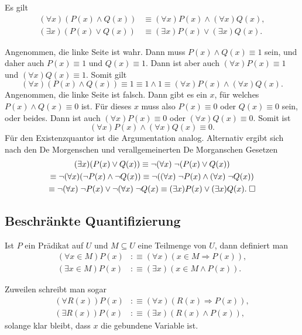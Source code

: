 \begin{Satz}[Verträglichkeitsgesetze]
Es gilt
\begin{align*}
(\forall x)(P(x)\land Q(x)) &\equiv (\forall x)P(x)\land (\forall x)Q(x),\\
(\exists x)(P(x)\lor Q(x)) &\equiv (\exists x)P(x)\lor (\exists x)Q(x).
\end{align*}
\end{Satz}
 Angenommen, die linke Seite ist wahr. Dann muss
$P(x)\land Q(x)\equiv 1$ sein, und daher auch $P(x)\equiv 1$ und
$Q(x)\equiv 1$. Dann ist aber auch
$(\forall x)P(x)\equiv 1$ und $(\forall x)Q(x)\equiv 1$. Somit gilt
\begin{equation}
(\forall x)(P(x)\land Q(x)) \equiv 1 \equiv
1\land 1 \equiv (\forall x)P(x)\land (\forall x)Q(x).
\end{equation}
Angenommen, die linke Seite ist falsch. Dann gibt es
ein $x$, für welches $P(x)\land Q(x)\equiv 0$ ist. Für dieses $x$
muss also $P(x)\equiv 0$ oder $Q(x)\equiv 0$ sein, oder beides.
Dann ist auch $(\forall x)P(x)\equiv 0$ oder $(\forall x)Q(x)\equiv 0$.
Somit ist
\begin{equation}
(\forall x)P(x)\land(\forall x)Q(x)\equiv 0.
\end{equation}
Für den Existenzquantor ist die Argumentation analog. Alternativ
ergibt sich nach den De Morgenschen und verallgemeinerten De Morganschen
Gesetzen
\begin{gather}
(\exists x)(P(x)\lor Q(x))
\equiv \neg(\forall x)\;\neg (P(x)\lor Q(x))\\
\equiv \neg(\forall x)(\neg P(x)\land \neg Q(x))
\equiv \neg((\forall x)\;\neg P(x)\land (\forall x)\;\neg Q(x))\\
\equiv \neg(\forall x)\;\neg P(x)\lor\neg(\forall x)\;\neg Q(x)
\equiv (\exists x) P(x)\lor(\exists x) Q(x).\;\Box
\end{gather}


\newpage
\subsection{Beschränkte Quantifizierung}
\begin{Definition}
Ist $P$ ein Prädikat auf $U$ und $M\subseteq U$ eine Teilmenge von
$U$, dann definiert man
\begin{align*}
(\forall x\in M)P(x) &:\equiv (\forall x)(x\in M\Rightarrow P(x)),\\
(\exists x\in M)P(x) &:\equiv (\exists x)(x\in M\land P(x)).
\end{align*}
\end{Definition}
Zuweilen schreibt man sogar
\begin{align}
(\forall R(x))P(x) &:\equiv (\forall x)(R(x)\Rightarrow P(x)),\\
(\exists R(x))P(x) &:\equiv (\exists x)(R(x)\land P(x)),
\end{align}
solange klar bleibt, dass $x$ die gebundene Variable ist.


